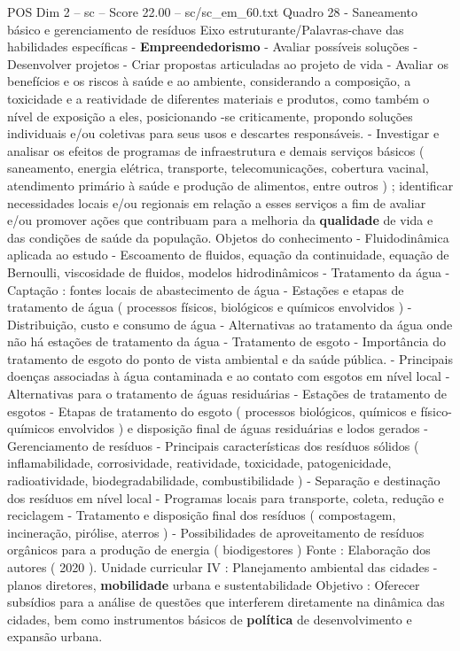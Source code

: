\begin{textsample}{POS Dim 2 – sc – Score 22.00 – sc/sc\_em\_60.txt}
Quadro 28 - Saneamento básico e gerenciamento de resíduos Eixo estruturante/Palavras-chave das habilidades específicas - \textbf{Empreendedorismo} - Avaliar possíveis soluções - Desenvolver projetos - Criar propostas articuladas ao projeto de vida - Avaliar os benefícios e os riscos à saúde e ao ambiente, considerando a composição, a toxicidade e a reatividade de diferentes materiais e produtos, como também o nível de exposição a eles, posicionando -se criticamente, propondo soluções individuais e/ou coletivas para seus usos e descartes responsáveis. - Investigar e analisar os efeitos de programas de infraestrutura e demais serviços básicos ( saneamento, energia elétrica, transporte, telecomunicações, cobertura vacinal, atendimento primário à saúde e produção de alimentos, entre outros ) ; identificar necessidades locais e/ou regionais em relação a esses serviços a fim de avaliar e/ou promover ações que contribuam para a melhoria da \textbf{qualidade} de vida e das condições de saúde da população.
Objetos do conhecimento - Fluidodinâmica aplicada ao estudo - Escoamento de fluidos, equação da continuidade, equação de Bernoulli, viscosidade de fluidos, modelos hidrodinâmicos - Tratamento da água - Captação : fontes locais de abastecimento de água - Estações e etapas de tratamento de água ( processos físicos, biológicos e químicos envolvidos ) - Distribuição, custo e consumo de água - Alternativas ao tratamento da água onde não há estações de tratamento da água - Tratamento de esgoto - Importância do tratamento de esgoto do ponto de vista ambiental e da saúde pública. - Principais doenças associadas à água contaminada e ao contato com esgotos em nível local - Alternativas para o tratamento de águas residuárias - Estações de tratamento de esgotos - Etapas de tratamento do esgoto ( processos biológicos, químicos e físico-químicos envolvidos ) e disposição final de águas residuárias e lodos gerados - Gerenciamento de resíduos - Principais características dos resíduos sólidos ( inflamabilidade, corrosividade, reatividade, toxicidade, patogenicidade, radioatividade, biodegradabilidade, combustibilidade ) - Separação e destinação dos resíduos em nível local - Programas locais para transporte, coleta, redução e reciclagem - Tratamento e disposição final dos resíduos ( compostagem, incineração, pirólise, aterros ) - Possibilidades de aproveitamento de resíduos orgânicos para a produção de energia ( biodigestores ) Fonte : Elaboração dos autores ( 2020 ).
Unidade curricular IV : Planejamento ambiental das cidades - planos diretores, \textbf{mobilidade} urbana e sustentabilidade Objetivo : Oferecer subsídios para a análise de questões que interferem diretamente na dinâmica das cidades, bem como instrumentos básicos de \textbf{política} de desenvolvimento e expansão urbana.

\end{textsample}
